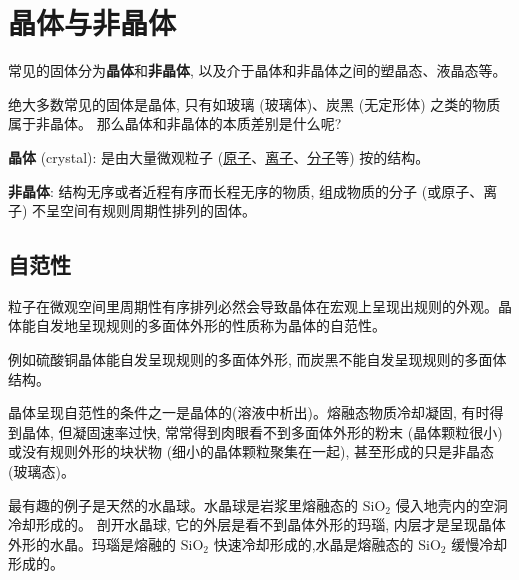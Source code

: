 \documentclass[10pt,cn]{elegantbook}
\begin{document}
\section{晶体与非晶体}

常见的固体分为\textbf{晶体}和\textbf{非晶体}, 以及介于晶体和非晶体之间的塑晶态、液晶态等。

绝大多数常见的固体是晶体, 只有如玻璃 (玻璃体)、炭黑 (无定形体) 之类的物质属于非晶体。 那么晶体和非晶体的本质差别是什么呢?

\textbf{晶体} (crystal): 是由大量微观粒子 (\underline{原子}、\underline{离子}、\underline{分子}等) 按的结构。


\textbf{非晶体}: 结构无序或者近程有序而长程无序的物质, 组成物质的分子 (或原子、离子) 不呈空间有规则周期性排列的固体。

\begin{center}
\end{center}

\subsection{自范性}

 粒子在微观空间里周期性有序排列必然会导致晶体在宏观上呈现出规则的外观。晶体能自发地呈现规则的多面体外形的性质称为晶体的自范性。

例如硫酸铜晶体能自发呈现规则的多面体外形, 而炭黑不能自发呈现规则的多面体结构。

晶体呈现自范性的条件之一是晶体的(溶液中析出)。熔融态物质冷却凝固, 有时得到晶体, 但凝固速率过快, 常常得到肉眼看不到多面体外形的粉末 (晶体颗粒很小) 或没有规则外形的块状物 (细小的晶体颗粒聚集在一起), 甚至形成的只是非晶态 (玻璃态)。

最有趣的例子是天然的水晶球。水晶球是岩浆里熔融态的 \({\mathrm{{SiO}}}_{2}\) 侵入地壳内的空洞冷却形成的。 剖开水晶球, 它的外层是看不到晶体外形的玛瑙, 内层才是呈现晶体外形的水晶。玛瑙是熔融的 \({\mathrm{{SiO}}}_{2}\) 快速冷却形成的,水晶是熔融态的 \({\mathrm{{SiO}}}_{2}\) 缓慢冷却形成的。
\end{document}
